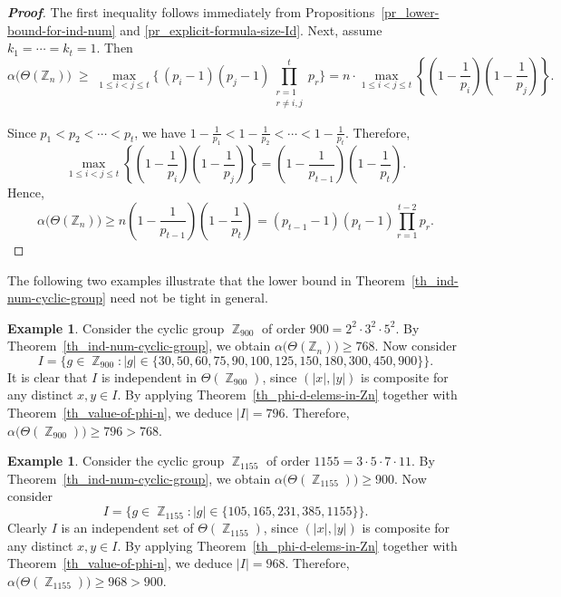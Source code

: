 \documentclass{amsart}
\theoremstyle{plain}
\theoremstyle{definition}
\newtheorem{example}[theorem]{Example}
\DeclareMathOperator{\Z}{\mathbb{Z}}
\begin{document}
\begin{proof}[\textbf{Proof}]
The first inequality follows immediately from  Propositions~\ref{pr_lower-bound-for-ind-num} and \ref{pr_explicit-formula-size-Id}. Next, assume $k_1 = \cdots = k_t = 1$. Then  \[
\alpha\bigl(\Theta(\mathbb{Z}_n)\bigr) \;\geq\; \max_{1\leq i < j\leq t}\biggl\{
\,(p_i - 1)(p_j - 1)\prod_{\substack{r=1\\ r\neq i,j}}^t p_r
\biggr\} = n\cdot \max_{1\leq i < j\leq t}\left\{\left(1- \frac{1}{p_i}\right) \left(1- \frac{1}{p_j}\right)\right\}.\]


Since $p_1 < p_2 < \cdots < p_t$, we have $1-\frac{1}{p_1} <  1-\frac{1}{p_2}< \cdots <1-\frac{1}{p_t}$. Therefore,  
\[\max_{1\leq i< j\leq t}\left\{ \left(1- \frac{1}{p_i}\right) \left(1- \frac{1}{p_j}\right)\right\} =  \left(1- \frac{1}{p_{t-1}}\right) \left(1- \frac{1}{p_t}\right).\] Hence, 
\[\alpha\bigl(\Theta(\mathbb{Z}_n)\bigr) \geq  n \left(1- \frac{1}{p_{t-1}}\right) \left(1- \frac{1}{p_t}\right)
= (p_{t-1}-1)(p_t-1) \prod_{r=1}^{t-2} p_r.\]
\end{proof}


The following two examples illustrate that the lower bound in Theorem~\ref{th_ind-num-cyclic-group} need not be tight in general.

\begin{example}
Consider the cyclic group $\Z_{900}$ of order $900=2^2\cdot 3^2 \cdot 5^2$. By Theorem~\ref{th_ind-num-cyclic-group}, we obtain  $\alpha\bigl(\Theta(\mathbb{Z}_n)\bigr)\geq 768$. Now consider 
\[I= \bigl\{g\in \Z_{900} \colon |g|\in\{30, 50, 60, 75, 90, 100, 125,  150, 180, 300, 450, 900\}\bigr\}.\] It is clear that $I$ is independent in $\Theta(\Z_{900})$, since $(|x|,|y|)$ is composite for any distinct $x, y \in I$. By applying Theorem~\ref{th_phi-d-elems-in-Zn} together with Theorem~\ref{th_value-of-phi-n}, we deduce $|I|=796$. Therefore,
$\alpha\bigl(\Theta(\Z_{900})\bigr)\geq 796 > 768$.
\end{example}


\begin{example}
	Consider the cyclic group $\Z_{1155}$ of order $1155= 3 \cdot 5\cdot 7\cdot 11$. By Theorem~\ref{th_ind-num-cyclic-group}, we obtain $\alpha\bigl(\Theta(\Z_{1155})\bigr) \geq 900$. Now consider 
	\[I = \bigl\{g\in \Z_{1155}\colon |g|\in \{105, 165, 231, 385, 1155\}\bigr\}.\] Clearly $I$ is an independent set of $\Theta(\Z_{1155})$, since $(|x|, |y|)$ is composite for any distinct $x, y\in I$. By applying Theorem~\ref{th_phi-d-elems-in-Zn} together with Theorem~\ref{th_value-of-phi-n}, we deduce $|I|=968$. Therefore,
	$\alpha\bigl(\Theta(\Z_{1155})\bigr)\geq 968 > 900$.
	\end{example}
\end{document}
